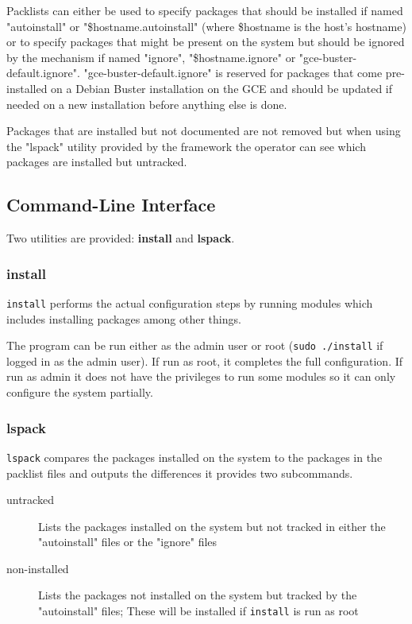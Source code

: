 \documentclass[12pt,a4paper,oneside]{report}
\begin{document}
	Packlists can either be used to specify packages that should be installed if named "autoinstall" or "\$hostname.autoinstall" (where \$hostname is the host's hostname) or to specify packages that might be present on the system but should be ignored by the mechanism if named "ignore", "\$hostname.ignore" or "gce-buster-default.ignore". "gce-buster-default.ignore" is reserved for packages that come pre-installed on a Debian Buster installation on the GCE and should be updated if needed on a new installation before anything else is done.

	Packages that are installed but not documented are not removed but when using the "lspack" utility provided by the framework the operator can see which packages are installed but untracked.

	\subsection{Command-Line Interface}
	Two utilities are provided: \textbf{install} and \textbf{lspack}.

	\subsubsection{install}
	\lstinline|install| performs the actual configuration steps by running modules which includes installing packages among other things.

	\pagebreak
	The program can be run either as the admin user or root (\lstinline|sudo ./install| if logged in as the admin user). If run as root, it completes the full configuration. If run as admin it does not have the privileges to run some modules so it can only configure the system partially.

	\subsubsection{lspack}
	\lstinline|lspack| compares the packages installed on the system to the packages in the packlist files and outputs the differences it provides two subcommands.

	\begin{description}
		\item[untracked] Lists the packages installed on the system but not tracked in either the "autoinstall" files or the "ignore" files
		\item[non-installed] Lists the packages not installed on the system but tracked by the "autoinstall" files; These will be installed if \lstinline|install| is run as root
	\end{description}
\end{document}
